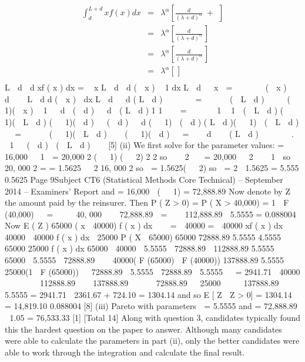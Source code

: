 \documentclass[a4paper,12pt]{article}
\begin{document}
\begin{eqnarray*}
\int^{L+d}_{d} xf(x) dx
&=& \lambda^{\alpha} \left[ \frac{d}{(\lambda + d)^\alpha } \;+\; \frac{}{}  \right] \\
&=& \lambda^{\alpha} \left[ \frac{d}{(\lambda + d)^\alpha } \frac{}{} \right] \\
&=& \lambda^{\alpha} \left[ \frac{d}{(\lambda + d)^\alpha } \frac{}{} \right] \\
&=& \lambda^{\alpha} \left[ \frac{}{} \right] \\
\end{eqnarray*}
L  d
 d
xf ( x ) dx
=
\alpha  x
L  d
 d
( \alpha  x )  1
dx
L  d

\alpha  x 
=  
 
  ( \alpha  x )   d
 
\alpha 
L  d
d
( \alpha  x ) 
dx
L  d

 d
( L  d )  
\alpha 



= \alpha 




( \alpha  L  d )     (   1)( \alpha  x )  1   d
 ( \alpha  d )

 d

( L  d )
1
1



= \alpha  


 1
 1 
( \alpha  L  d )
(   1)( \alpha  L  d )
(   1)( \alpha  d ) 
 ( \alpha  d )
  d (   1)  ( \alpha  d ) ( L  d )(   1)  ( \alpha  L  d )  
= \alpha  



(   1)( \alpha  L  d ) 
  (   1)( \alpha  d )
 
=
\alpha    d   \alpha  ( L  d )  \alpha  


 .
  1   ( \alpha  d )  ( \alpha  L  d )   
[5]
(ii)
We first solve for the parameter values:
\alpha
= 16,000
  1

= 20,000 2
(   1) (   2)
2
2
so 
 \alpha 
2

 = 20,000
  2    1 
so 
20, 000 2
=
= 1.5625
  2 16, 000 2
so  = 1.5625(   2)
so  = 2 
1.5625
= 5.555
0.5625
Page 9Subject CT6 (Statistical Methods Core Technical) – September 2014 – Examiners’ Report
and
\alpha = 16,000  (   1)
= 72,888.89
Now denote by Z the amount paid by the reinsurer.
Then P ( Z > 0) = P ( X > 40,000) = 1  F (40,000)
\alpha


= 

 \alpha  40, 000 

 72,888.89 
= 

 112,888.89 
5.5555
= 0.088004
Now
E ( Z )
65000
( x  40000) f ( x ) dx  

=  40000
=  40000 xf ( x ) dx  40000  40000 f ( x ) dx  25000 P ( X  65000)
65000
72888.89 5.5555
4.5555

65000
25000 f ( x ) dx
65000
 40000  5.5555  72888.89

112888.89 5.5555

65000  5.5555  72888.89 
  40000( F (65000)  F (40000))
137888.89 5.5555

 25000(1  F (65000))
  72888.89  5.5555  72888.89  5.5555 

= 2941.71  40000  
 

  112888.89  

137888.89




 72888.89 
 25000  

 137888.89 
5.5555
= 2941.71  2361.67 + 724.10
= 1304.14
and so E [ Z  Z > 0] =
1304.14
= 14,819.10
0.088004
[8]
\newpage 
(iii)
Pareto with parameters  = 5.5555 and \alpha = 72,888.89  1.05
= 76,533.33
[1]
[Total 14]
Along with question 3, candidates typically found this the hardest question on the paper to
answer. Although many candidates were able to calculate the parameters in part (ii), only
the better candidates were able to work through the integration and calculate the final result.
\end{document}
